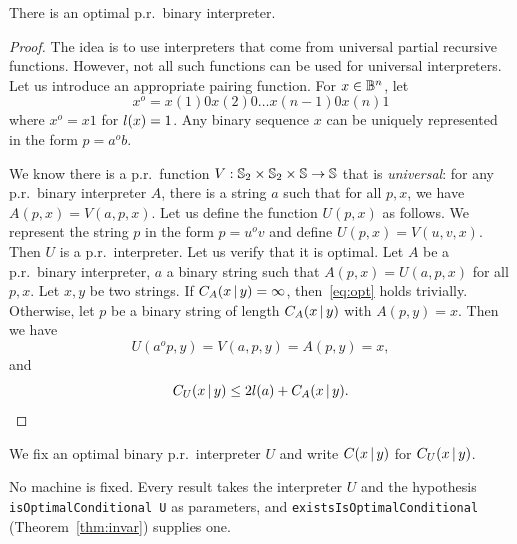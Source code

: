 \begin{theorem}
  \leanok
   \label{thm:invar}
 There is an optimal p.r.~binary interpreter.
 \end{theorem}

\begin{proof}
  \leanok
The idea is to use interpreters that come from universal partial recursive
functions.
However,  not all such functions can be used for universal interpreters.
Let us introduce an appropriate pairing function.
For \( x \in \mathbb{B}^{n} \), let 
 \[
   x^{o} = x(1) 0 x(2) 0 \ldots x(n-1) 0 x(n) 1 
 \]
  where \( x^o = x1 \) for \( l(x) =1 \). Any binary sequence \( x \) can be
uniquely represented in the form \( p = a^o b \). 

We know there is a p.r.~function
\( V : \mathbb{S}_{2} \times \mathbb{S}_{2} \times \mathbb{S} \to \mathbb{S} \) that
is \emph{universal}: for any
p.r.~binary interpreter \( A \), there is a string \( a \) such that for all
\( p,x \), we have \( A(p,x) = V(a,p,x) \). 
Let us define the function \( U(p,x) \) as follows. 
We represent the string \( p \) in the form 
\( p = u^o v \) and define \(  U(p,x) = V(u,v,x)  \). 
Then \( U \) is a p.r.~interpreter.
Let us verify that it is optimal. 
Let \( A \) be a p.r.~binary
interpreter, \( a \) a binary string such that \( A(p,x) = U(a,p,x) \) for
all \( p,x \). 
Let \( x,y \) be two strings. 
If \( C_A(x \,\vert\, y)=\infty \), then~\eqref{eq:opt} holds trivially. 
Otherwise, let \( p \) be a binary string of
length \( C_A(x \,\vert\, y) \) with \( A(p,y)=x \). 
Then we have
 \[
  U(a^o p, y) = V(a,p,y) = A(p,y) = x, 
 \]
  and
 \[
  C_U(x \,\vert\, y) \le 2l(a) + C_A(x \,\vert\, y).
 \]
  \end{proof}

 \begin{definition}
  \label{def:fixed-U}
  \leanok
We fix an optimal binary p.r.~interpreter \( U \) and write 
\( C(x \,\vert\, y) \) for \( C_U(x \,\vert\, y) \). 
 \end{definition}
\begin{formalization}
No machine is fixed. Every result takes the interpreter $U$ and the hypothesis \texttt{isOptimalConditional U} as parameters, and \texttt{existsIsOptimalConditional} (Theorem~\ref{thm:invar}) supplies one.
\end{formalization}


